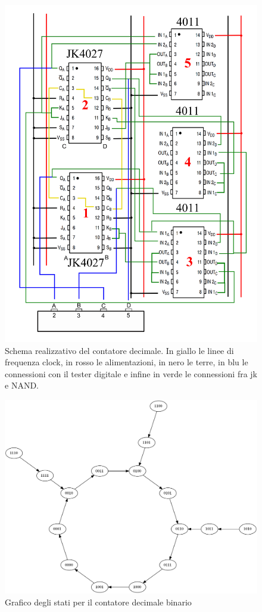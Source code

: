 \documentclass[journal, a4paper]{IEEEtran}
\begin{document}
\begin{figure}
\centering
\includegraphics[width=0.8\linewidth]{./circuito_counter_up}
\caption{Schema realizzativo del contatore decimale. In giallo le linee di frequenza clock, in rosso le alimentazioni, in nero le terre, in blu le connessioni con il tester digitale e infine in verde le connessioni fra jk e NAND.}
\label{fig:circuito_counter_up}
\end{figure}


\begin{figure}
\centering
\includegraphics[width=0.9\linewidth]{./dec_count_graph}
\caption{Grafico degli stati per il contatore decimale binario}
\label{fig:dec_count_graph}
\end{figure}
\end{document}
